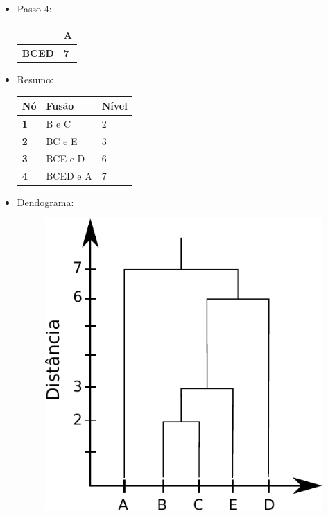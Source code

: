 \documentclass[
    article,            %
    11pt,               %
    oneside,            %
    a4paper,            %
    english,            %
    brazil,             %
    sumario=tradicional,
    ]{abntex2}
\begin{document}
\begin{itemize}
    \item{Passo 4:}
        \begin{table}[h]
        \centering
        \label{my-label}
        \begin{tabular}{|l|l|}
        \hline
                      & \textbf{A}                        \\ \hline
        \textbf{BCED} & {\color[HTML]{FE0000} \textbf{7}} \\ \hline
        \end{tabular}
        \end{table}

    \item{Resumo:}
        \begin{table}[H]
        \centering
        \label{my-label}
        \begin{tabular}{|l|l|l|}
        \hline
        \textbf{Nó}         & \textbf{Fusão} & \textbf{Nível} \\ \hline
        \textbf{1} & B e C          & 2              \\ \hline
        \textbf{2} & BC e E         & 3              \\ \hline
        \textbf{3} & BCE e D        & 6              \\ \hline
        \textbf{4} & BCED e A       & 7              \\ \hline
        \end{tabular}
        \end{table}
    \item{Dendograma:}
        \begin{figure}[H]
        \label{fig_dendograma1}
        \begin{center}
            \includegraphics[scale=0.7]{imgs/dendograma1.pdf}
        \end{center}
        \end{figure}
\end{itemize}
\end{document}
